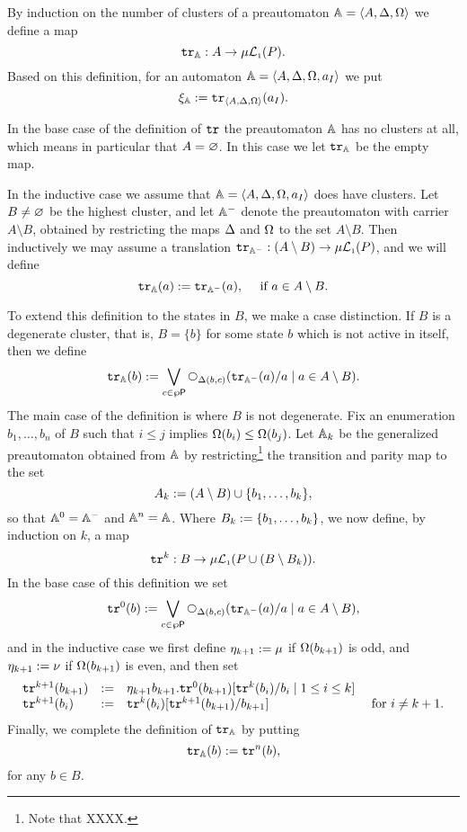 \begin{definition}
\label{d:tr}
By induction on the number of clusters of a preautomaton $\mathbb{A} = \langle{A,\Delta,
\Omega}\rangle$ we define a map 
\[
\mathtt{tr}_{\mathbb{A}}: A \to \mu\mathcal{L}_{\scriptscriptstyle 1}(P).
\]
Based on this definition, for an automaton $\mathbb{A} = \langle{A,\Delta,\Omega, a_{I}}\rangle$ 
we put
\[
\xi_{\mathbb{A}} \mathrel{:=} \mathtt{tr}_{\langle{A,\Delta,\Omega}\rangle}(a_{I}).
\]

In the base case of the definition of $\mathtt{tr}$ the preautomaton $\mathbb{A}$ has no 
clusters at all, which means in particular that $A = \varnothing$.
In this case we let $\mathtt{tr}_{\mathbb{A}}$ be the empty map.

In the inductive case we assume that $\mathbb{A} = \langle{A,\Delta,\Omega, a_{I}}\rangle$ does 
have clusters. 
Let $B \neq \varnothing$ be the highest cluster, and let $\mathbb{A}^{-}$ denote the 
preautomaton with carrier $A \setminus B$, obtained by restricting the maps 
$\Delta$ and $\Omega$ to the set $A \setminus B$.
Then inductively we may assume a translation $\mathtt{tr}_{\mathbb{A}^{-}}: (A \setminus B)
\to \mu\mathcal{L}_{\scriptscriptstyle 1}(P)$, and we will define
\[
\ytr_{\bbA}(a) \isdef \ytr_{\bbA^{-}}(a), \quad\text{ if } a \in A \setminus B.
\]

To extend this definition to the states in $B$, we make a case 
distinction.
If $B$ is a degenerate cluster, that is, $B = \{ b \}$ for some state $b$ 
which is not active in itself, then we define
\[
\ytr_{\bbA}(b) \isdef
   \bigvee_{c \in \wp{\props}}
   \nxt{\tmap(b,c)}(\ytr_{\bbA^{-}}(a)/a \mid a \in A \setminus B).
\]
The main case of the definition is where $B$ is not degenerate.
Fix an enumeration $b_{1},\ldots,b_{n}$ of $B$ such that $i \leq j$ implies 
$\Omega(b_{i}) \leq \Omega(b_{j})$.
Let $\mathbb{A}_{k}$ be the generalized preautomaton obtained from $\mathbb{A}$ by 
restricting\footnote{Note that XXXX.
   }
the transition and parity map to the set
\[
A_{k} \mathrel{:=} (A\setminus B) \cup \{ b_{1},\ldots,b_{k} \},
\]
so that $\mathbb{A}^{0} = \mathbb{A}^{-}$ and $\mathbb{A}^{n} = \mathbb{A}$.
Where $B_{k} \mathrel{:=} \{ b_{1},\ldots,b_{k} \}$, we now define, by induction on 
$k$, a map 
\[
\mathtt{tr}^{k}: B \to \mu\mathcal{L}_{\scriptscriptstyle 1}(P \cup (B \setminus B_{k})).
\]
In the base case of this definition we set
\[
\ytr^{0}(b) \isdef 
   \bigvee_{c \in \wp{\props}} 
   \nxt{\tmap(b,c)}(\ytr_{\bbA^{-}}(a)/a \mid a \in A \setminus B),
\]
and in the inductive case we first define $\eta_{k+1} \mathrel{:=} \mu$ if
$\Omega(b_{k+1})$ is odd, and $\eta_{k+1} \mathrel{:=} \nu$ if $\Omega(b_{k+1})$ is 
even, and then set
\[\begin{array}{llll}
     \ytr^{k+1}(b_{k+1}) &\isdef &
   \eta_{k+1} b_{k+1}. \ytr^{0}(b_{k+1})[\ytr^{k}(b_{i})/b_{i} \mid 1 \leq i\leq k]
\\ \ytr^{k+1}(b_{i}) &\isdef &
   \ytr^{k}(b_{i})[\ytr^{k+1}(b_{k+1})/b_{k+1}]
   & \text{ for } i \neq k+1.
\end{array}\]
Finally, we complete the definition of $\mathtt{tr}_{\mathbb{A}}$ by putting
\[
\mathtt{tr}_{\mathbb{A}}(b) \mathrel{:=} \mathtt{tr}^{n}(b),
\]
for any $b \in B$.
\end{definition}

